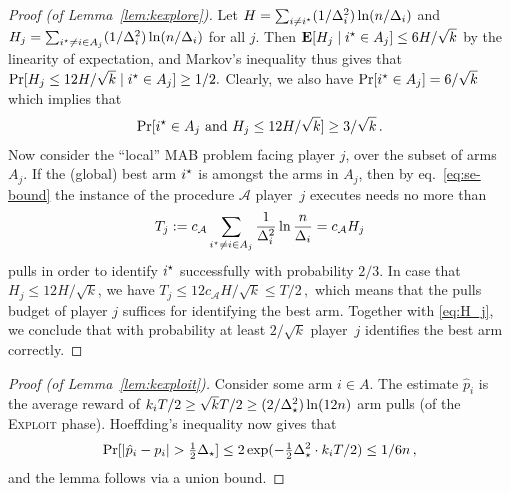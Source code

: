 \documentclass{article} %
\newcommand{\phat}{\hat{p}}
\newcommand{\Delst}{\Del_{\st}}
\newcommand{\cA}{c_\mathcal{A}}
\begin{document}
\begin{proof}[Proof (of Lemma~\ref{lem:kexplore})]
Let $H = \sum_{i \ne i^\star} (1/\Delta_i^2) \ln (n/\Delta_i)$ and
$H_j = \sum_{i^\star \ne i \in A_j} (1/\Delta_i^2) \ln (n/\Delta_i)$ for all $j$.
Then $\mathbf{E}[H_j \mid i^\star \in A_j] \le 6H/\sqrt{k}$ by the linearity of expectation, and Markov's inequality thus gives that
$
	\Pr[H_j \le 12H/\sqrt{k} \mid i^\star \in A_j]
	\ge 1/2 .
$
Clearly, we also have $\Pr[i^\star \in A_j] = 6/\sqrt{k}$ which implies that
\begin{align} \label{eq:H_j}
	\Pr[i^\star \in A_j \mbox{ and } H_j \le 12H/\sqrt{k}] \ge 3/\sqrt{k} \,.
\end{align}
Now consider the ``local'' MAB problem facing player $j$, over the subset of arms $A_j$. If the (global) best arm $i^\star$ is amongst the arms in $A_j$, then by eq.~\eqref{eq:se-bound} the instance of the procedure $\mathcal{A}$ player~$j$ executes needs no more than
\begin{align*}
	T_j
	:= \cA \sum_{i^\st \ne i \in A_j} \frac{1}{\Del_i^2}\ln \frac{n}{\Del_i}
	= \cA H_j
\end{align*}
pulls in order to identify $i^\star$ successfully with probability $2/3$. 
In case that $H_j \le 12H/\sqrt{k}$, we have
$
	T_j
	\le 12 \cA H / \sqrt{k}
	\le T/2 \,,
$
which means that the pulls budget of player $j$ suffices for identifying the
best arm. Together with \eqref{eq:H_j}, we conclude that with probability at
least $2/\sqrt{k}$ player~$j$ identifies the best arm correctly.
\end{proof}




\begin{proof}[Proof (of Lemma~\ref{lem:kexploit})]
Consider some arm $i \in A$. The estimate $\phat_i$ is the average reward of 
$k_i T/2 \ge \sqrt{k} T/2 \ge (2/\Delst^2) \ln(12n)$
arm pulls (of the \textsc{Exploit} phase).
Hoeffding's inequality now gives that
\begin{align*}
	\Pr[\abs{\phat_i - p_i} > \tfrac{1}{2} \Delst]
	\le 2 \exp (-\tfrac{1}{2} \Delst^2 \cdot k_i T/2)
	\le 1/6n \,,
\end{align*}
and the lemma follows via a union bound.
\end{proof}
\end{document}
